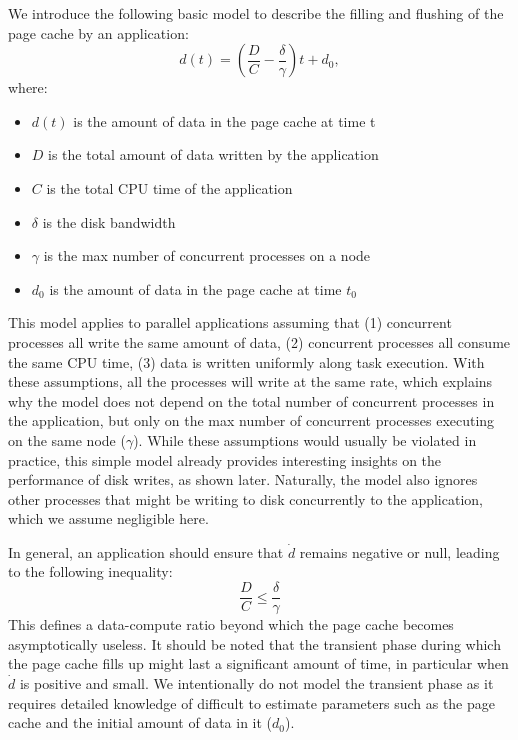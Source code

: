 \documentclass{IEEEtran}
\begin{document}
We introduce the following basic model to describe the filling and 
flushing of the page cache by an application:
$$
d(t) = \left( \frac{D}{C} - \frac{\delta}{\gamma} \right)t + d_0,
$$
where:
\begin{itemize}
\item $d(t)$ is the amount of data in the page cache at time t
\item $D$ is the total amount of data written by the application
\item $C$ is the total CPU time of the application
\item $\delta$ is the disk bandwidth
\item $\gamma$ is the max number of concurrent processes on a node
\item $d_0$ is the amount of data in the page cache at time $t_0$
\end{itemize}

This model applies to parallel applications assuming that (1) 
concurrent processes all write the same amount of data, (2) 
concurrent processes all consume the same CPU time, (3) data is written 
uniformly along task execution. With these assumptions, all the 
processes will write at the same rate, which explains why the model 
does not depend on the total number of concurrent processes in the 
application, but only on the max number of concurrent processes 
executing on the same node ($\gamma$). While these 
assumptions would usually be violated in practice, this simple 
model already provides interesting insights on the performance of disk 
writes, as shown later. Naturally, the model also ignores other 
processes that might be writing to disk concurrently to the 
application, which we assume negligible here. 

In general, an application should ensure that $\dot d$ remains negative 
or null, leading to the following inequality:
\begin{equation}
\frac{D}{C} \leq \frac{\delta}{\gamma} \label{eq:page-cache-inequality}
\end{equation}
This defines a data-compute ratio beyond which the page cache becomes 
asymptotically useless. It should be noted that the transient phase 
during which the page cache fills up might last a significant amount of time, 
in particular when $\dot d$ is positive and small. We intentionally do not model the 
transient phase as it requires detailed knowledge of difficult to estimate parameters  
such as the page cache and the initial amount 
of data in it ($d_0$).
\end{document}
